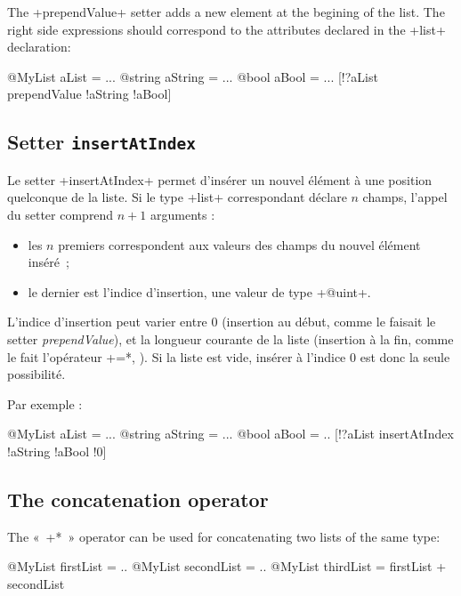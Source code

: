 The \ggst+prependValue+ setter adds a new element at the begining of the list. The right side expressions should correspond to the attributes declared in the  \ggst+list+ declaration:

\begin{galgas3}
@MyList aList = ...
@string aString = ...
@bool aBool = ...
[!?aList prependValue !aString !aBool]
\end{galgas3}




\subsection{Setter \texttt{insertAtIndex}}

Le setter \ggst+insertAtIndex+ permet d'insérer un nouvel élément à une position quelconque de la liste. Si le type \ggst+list+ correspondant déclare $n$ champs, l'appel du setter comprend $n+1$ arguments :
\begin{itemize}
  \item les $n$ premiers correspondent aux valeurs des champs du nouvel élément inséré~;
  \item le dernier est l'indice d'insertion, une valeur de type \ggst+@uint+.
\end{itemize}

L'indice d'insertion peut varier entre $0$ (insertion au début, comme le faisait le setter \emph{prependValue}), et la longueur courante de la liste (insertion à la fin, comme le fait l'opérateur \ggst*+=*, ). Si la liste est vide, insérer à l'indice $0$ est donc la seule possibilité.

Par exemple :

\begin{galgas3}
@MyList aList = ...
@string aString = ...
@bool aBool = ..
[!?aList insertAtIndex !aString !aBool !0]
\end{galgas3}

\subsection{The concatenation operator}

The «~\ggst*+*~» operator can be used for concatenating two lists of the same type:


\begin{galgas3}
@MyList firstList = ..
@MyList secondList = ..
@MyList thirdList = firstList + secondList
\end{galgas3}

